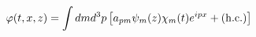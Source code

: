 \begin{equation}
\varphi(t,x,z) = \int dm d^{3}p \left[a_{pm} \psi_{m}(z) \chi_{m}(t) e^{i p x}
+ ({\rm h.c.}) \right]
\end{equation}

